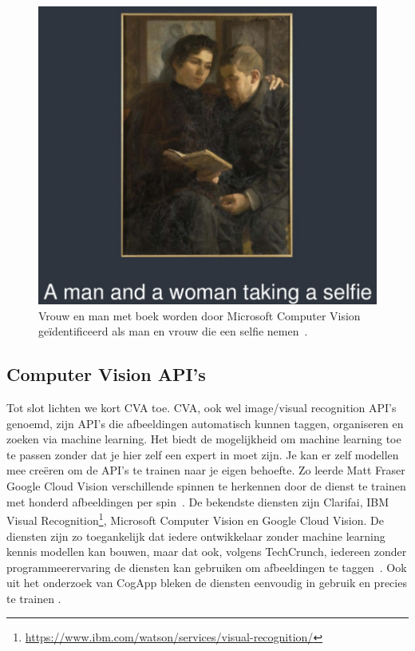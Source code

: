 \documentclass[fleqn,10pt]{voorstel}
\begin{document}
\begin{itemize}
	\begin{figure}[h]
		\caption{Vrouw en man met boek worden door Microsoft Computer Vision ge\"identificeerd als man en vrouw die een selfie nemen~\autocite{Roddis2018}.}
		\centering
		\includegraphics[width=\linewidth]{pictures/roddis_grappig_2}
	\end{figure}

\end{itemize}

\subsection{Computer Vision API's}
Tot slot lichten we kort CVA toe. CVA, ook wel image/visual recognition API's genoemd, zijn API's die afbeeldingen automatisch kunnen taggen, organiseren en zoeken via machine learning. Het biedt de mogelijkheid om machine learning toe te passen zonder dat je hier zelf een expert in moet zijn. Je kan er zelf modellen mee creëren om de API's te trainen naar je eigen behoefte. Zo leerde Matt Fraser Google Cloud Vision verschillende spinnen te herkennen door de dienst te trainen met honderd afbeeldingen per spin~\autocite{Fraser2018}.  De bekendste diensten zijn Clarifai, IBM Visual Recognition\footnote{\url{https://www.ibm.com/watson/services/visual-recognition/}}, Microsoft Computer Vision en Google Cloud Vision.  De diensten zijn zo toegankelijk dat iedere ontwikkelaar zonder machine learning kennis modellen kan bouwen, maar dat ook, volgens TechCrunch, iedereen zonder programmeerervaring de diensten kan gebruiken om afbeeldingen te taggen~\autocite{Lardinois2018}. Ook uit het onderzoek van CogApp bleken de diensten eenvoudig in gebruik en precies te trainen \autocite{Hindle2017}.
\end{document}
